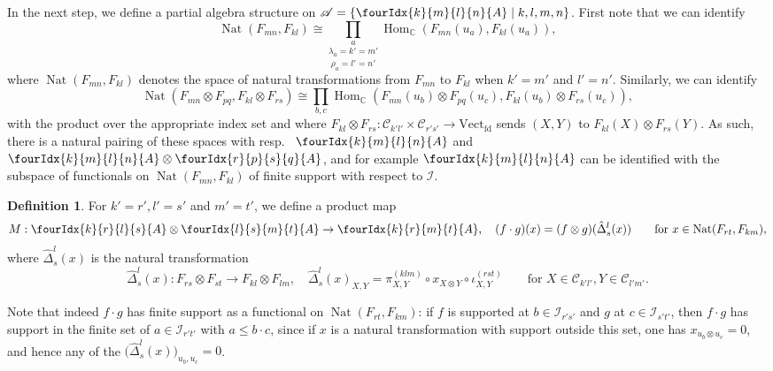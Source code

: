 \documentclass[10pt]{article}
\DeclareMathOperator{\fin}{\mathrm{fd}}
\DeclareMathOperator{\Hom}{Hom}
\DeclareMathOperator{\Nat}{\mathrm{Nat}}
\newcommand{\C}{\mathbb{C}}
\newcommand{\CatC}{\mathcal{C}}
\newcommand{\Vect}{\mathrm{Vect}}
\newcommand{\Gr}[5]{\fourIdx{#2}{#4}{#3}{#5}{#1}}%
\theoremstyle{definition}
\newtheorem{Def}[Theorem]{Definition}
\numberwithin{equation}{section}
\begin{document}
In the next step, we define a partial algebra structure on $\mathscr{A} = \{\Gr{A}{k}{l}{m}{n}\mid k,l,m,n\}$. First note that we can identify \[\Nat(F_{mn},F_{kl}) \cong \underset{\rho_a=l'=n'}{\underset{\lambda_a=k'=m'}{\prod_a}} \Hom_{\C}(F_{mn}(u_a),F_{kl}(u_a)),\] where $\Nat(F_{mn},F_{kl})$ denotes the space of natural transformations from $F_{mn}$ to $F_{kl}$ when $k'=m'$ and $l'=n'$. Similarly, we can identify \[\Nat(F_{mn}\otimes F_{pq},F_{kl}\otimes F_{rs}) \cong  \prod_{b,c} \Hom_{\C}(F_{mn}(u_b)\otimes F_{pq}(u_c) ,F_{kl}(u_b)\otimes F_{rs}(u_c)),\] with the product over the appropriate index set and where $F_{kl}\otimes F_{rs}:\CatC_{k'l'}\times \CatC_{r's'}\rightarrow \Vect_{\fin}$ sends $(X,Y)$ to $F_{kl}(X)\otimes F_{rs}(Y).$ As such, there is a natural pairing of these spaces with resp.~ $\Gr{A}{k}{l}{m}{n}$ and $\Gr{A}{k}{l}{m}{n}\otimes \Gr{A}{r}{s}{p}{q}$, and for example $\Gr{A}{k}{l}{m}{n}$ can be identified with the subspace of functionals on $\Nat(F_{mn},F_{kl})$ of finite support with respect to $\mathcal{I}$. 

\begin{Def} For $k'=r', l'=s'$ and $m'=t'$, we define a product
  map \[M:\Gr{A}{k}{l}{r}{s} \otimes \Gr{A}{l}{m}{s}{t}\rightarrow
  \Gr{A}{k}{m}{r}{t},\quad (f\cdot g)(x) = (f\otimes g)(
  \hat{\Delta}^{l}_{s}(x)) \qquad  \textrm{for }x \in
  \Nat(F_{rt},F_{km}),\] where $\hat{\Delta}^l_s(x)$ is the natural
  transformation \[\hat{\Delta}^l_s(x):  F_{rs}\otimes
  F_{st}\rightarrow F_{kl}\otimes F_{lm},\quad
  \hat{\Delta}^l_s(x)_{X,Y} = \pi^{(klm)}_{X,Y} \circ x_{X\otimes Y} \circ \iota^{(rst)}_{X,Y} \qquad \textrm{for }X\in \CatC_{k'l'},Y\in \CatC_{l'm'}.\]
\end{Def}

Note that indeed $f\cdot g$ has finite support as a functional on $\Nat(F_{rt},F_{km})$: if $f$ is supported at $b\in \mathcal{I}_{r's'}$ and $g$ at $c\in \mathcal{I}_{s't'}$, then $f\cdot g$ has support in the finite set of $a\in \mathcal{I}_{r't'}$ with $a\leq b\cdot c$, since if $x$ is a natural transformation with support outside this set, one has $x_{u_b\otimes u_c}=0$, and hence any of the $\big(\hat{\Delta}^l_s(x)\big)_{u_b,u_c} =0$.
\end{document}
